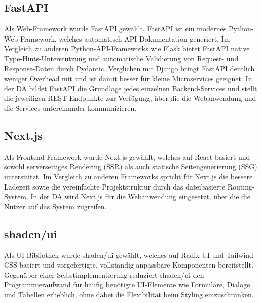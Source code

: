 \subsection{FastAPI}

Als Web-Framework wurde FastAPI gewählt. FastAPI ist ein modernes Python-Web-Framework,
welches automatisch API-Dokumentation generiert.\cite{fastapi}
Im Vergleich zu anderen Python-API-Frameworks wie Flask bietet FastAPI native Type-Hints-Unterstützung 
und automatische Validierung von Request- und Response-Daten durch 
Pydantic.\cite{jetbrains_frameworks}
Verglichen mit Django bringt FastAPI deutlich weniger Overhead mit und ist 
damit besser für kleine Microservices geeignet.\cite{jetbrains_frameworks}
In der DA bildet FastAPI die Grundlage jedes einzelnen 
Backend-Services und stellt die jeweiligen REST-Endpunkte zur Verfügung, 
über die die Webanwendung und die Services untereinander kommunizieren.

\subsection{Next.js}

Als Frontend-Framework wurde Next.js gewählt, welches auf React basiert 
und sowohl serverseitiges Rendering (SSR) als auch statische 
Seitengenerierung (SSG) unterstützt.\cite{nextjs}
Im Vergleich zu anderen Frameworks spricht für Next.js die bessere Ladezeit sowie
die vereinfachte Projektstruktur durch das dateibasierte Routing-System.
In der DA wird Next.js für die Webanwendung eingesetzt, 
über die die Nutzer auf das System zugreifen.

\subsection{shadcn/ui}

Als UI-Bibliothek wurde shadcn/ui gewählt, welches auf 
Radix UI und Tailwind CSS basiert und vorgefertigte, vollständig 
anpassbare Komponenten bereitstellt.\cite{shadcn}
Gegenüber einer Selbstimplementierung reduziert shadcn/ui den Programmieraufwand
für häufig benötigte UI-Elemente wie Formulare, Dialoge und Tabellen 
erheblich, ohne dabei die Flexibilität beim Styling einzuschränken.
